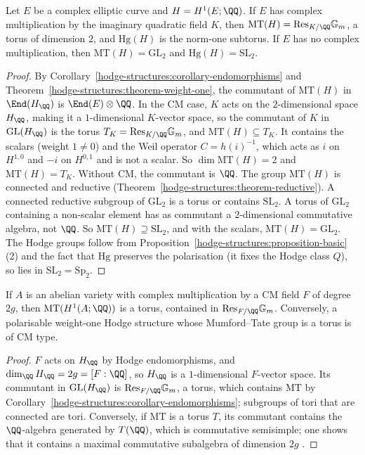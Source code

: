 \begin{proposition}\label{hodge-structures:proposition-elliptic-curves}
Let $E$ be a complex elliptic curve and $H = H^1(E; \QQ)$. If $E$ has complex multiplication by the imaginary quadratic field $K$, then $\mathrm{MT}(H) = \mathrm{Res}_{K/\QQ}\mathbb{G}_m$, a torus of
dimension $2$, and $\mathrm{Hg}(H)$ is the norm-one subtorus. If $E$ has no complex multiplication, then $\mathrm{MT}(H) = \mathrm{GL}_2$ and $\mathrm{Hg}(H) = \mathrm{SL}_2$.
\end{proposition}

\begin{proof}
By Corollary~\ref{hodge-structures:corollary-endomorphisms} and Theorem~\ref{hodge-structures:theorem-weight-one}, the commutant of $\mathrm{MT}(H)$ in $\End(H_\QQ)$ is $\End(E) \otimes \QQ$. In the CM case, $K$
acts on the $2$-dimensional space $H_\QQ$, making it a $1$-dimensional $K$-vector space, so the commutant of $K$ in $\mathrm{GL}(H_\QQ)$ is the torus $T_K = \mathrm{Res}_{K/\QQ}\mathbb{G}_m$, and
$\mathrm{MT}(H) \subseteq T_K$. It contains the scalars (weight $1 \neq 0$) and the Weil operator $C = h(i)^{-1}$, which acts as $i$ on $H^{1,0}$ and $-i$ on $H^{0,1}$ and is not a scalar. So
$\dim\mathrm{MT}(H) = 2$ and $\mathrm{MT}(H) = T_K$. Without CM, the commutant is $\QQ$. The group $\mathrm{MT}(H)$ is connected and reductive (Theorem~\ref{hodge-structures:theorem-reductive}). A
connected reductive subgroup of $\mathrm{GL}_2$ is a torus or contains $\mathrm{SL}_2$. A torus of $\mathrm{GL}_2$ containing a non-scalar element has as commutant a $2$-dimensional commutative
algebra, not $\QQ$. So $\mathrm{MT}(H) \supseteq \mathrm{SL}_2$, and with the scalars, $\mathrm{MT}(H) = \mathrm{GL}_2$. The Hodge groups follow from Proposition~\ref{hodge-structures:proposition-basic}(2)
and the fact that $\mathrm{Hg}$ preserves the polarisation (it fixes the Hodge class $Q$), so lies in $\mathrm{SL}_2 = \mathrm{Sp}_2$.
\end{proof}

\begin{proposition}\label{hodge-structures:proposition-cm}
If $A$ is an abelian variety with complex multiplication by a CM field $F$ of degree $2g$, then $\mathrm{MT}(H^1(A; \QQ))$ is a torus, contained in $\mathrm{Res}_{F/\QQ}\mathbb{G}_m$. Conversely, a
polarisable weight-one Hodge structure whose Mumford--Tate group is a torus is of CM type.
\end{proposition}

\begin{proof}
$F$ acts on $H_\QQ$ by Hodge endomorphisms, and $\dim_\QQ H_\QQ = 2g = [F : \QQ]$, so $H_\QQ$ is a $1$-dimensional $F$-vector space. Its commutant in $\mathrm{GL}(H_\QQ)$ is $\mathrm{Res}_{F/\QQ}\mathbb{G}_m$, a
torus, which contains $\mathrm{MT}$ by Corollary~\ref{hodge-structures:corollary-endomorphisms}; subgroups of tori that are connected are tori. Conversely, if $\mathrm{MT}$ is a torus $T$, its commutant
contains the $\QQ$-algebra generated by $T(\QQ)$, which is commutative semisimple; one shows that it contains a maximal commutative subalgebra of dimension $2g$ \cite{birkenhake-lange}.
\end{proof}

